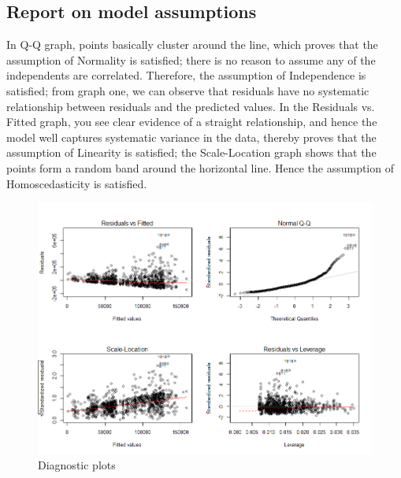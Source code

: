 \documentclass[12pt]{article}
\begin{document}
\subsection{Report on model assumptions}
In Q-Q graph, points basically cluster around the line, which proves that the assumption of Normality is satisfied; there is no reason to assume any of the independents are correlated. Therefore, the assumption of Independence is satisfied; from graph one, we can observe that residuals have no systematic relationship between residuals and the predicted values. In the Residuals vs. Fitted graph, you see clear evidence of a straight relationship, and hence the model well captures systematic variance in the data, thereby proves that the assumption of Linearity is satisfied; the Scale-Location graph shows that the points form a random band around the horizontal line. Hence the assumption of Homoscedasticity is satisfied. 
\begin{figure}[H]
	\centering
	\includegraphics[width=1\textwidth]{Rplot10.png}
	\caption{Diagnostic plots}
\end{figure}
\end{document}
